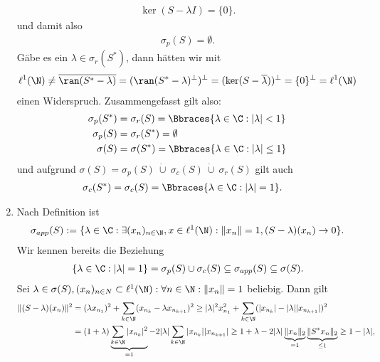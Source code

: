 \begin{solution}
\begin{enumerate}[label = (\alph*)]
  \begin{align*}
    \ker(S - \lambda I) = \{0\}.
  \end{align*}
  und damit also
  \begin{align*}
    \sigma_p(S) = \emptyset.
  \end{align*}
  Gäbe es ein $\lambda \in \sigma_r(S^*)$, dann hätten wir mit
  \begin{align*}
    \ell^1(\N) \neq \overline{\ran(S^* - \lambda)} = (\ran(S^* - \lambda)^{\bot})^{\bot} =
    (\ker(S - \overline{\lambda}))^{\bot} = \{0\}^{\bot} = \ell^1(\N)
  \end{align*}
  einen Widerspruch. Zusammengefasst gilt also:
  \begin{align*}
    \sigma_p(S^\ast) &= \sigma_r(S) = \Bbraces{\lambda \in \C: |\lambda| < 1} \\
    \sigma_p(S) &= \sigma_r(S^*) = \emptyset \\
    \sigma(S) &= \sigma(S^*) = \Bbraces{\lambda \in \C: |\lambda| \leq 1}
  \end{align*}
  und aufgrund $\sigma(S) = \sigma_p(S) ~\dot \cup~ \sigma_c(S) ~\dot \cup~ \sigma_r(S)$ gilt auch
  \begin{align*}
    \sigma_c(S^\ast) &= \sigma_c(S) = \Bbraces{\lambda \in \C: |\lambda| = 1}.
  \end{align*}
  \item Nach Definition ist
  \begin{align*}
    \sigma_{app}(S) := \{\lambda \in \C: \exists (x_n)_{n \in \N}, x \in \ell^1(\N): \|x_n\| = 1, (S - \lambda)(x_n) \to 0\}.
  \end{align*}
  Wir kennen bereits die Beziehung
  \begin{align*}
    \{\lambda \in \C: |\lambda| = 1 \} = \sigma_p(S) \cup \sigma_c(S) \subseteq \sigma_{app}(S) \subseteq \sigma(S).
  \end{align*}
  Sei $\lambda \in \sigma(S), (x_n)_{n \in N} \subset \ell^1(\N): \forall n \in \N: \|x_n\| = 1$ beliebig. Dann gilt
  \begin{align*}
    \|(S - \lambda)(x_n)\|^2 &=  (\lambda x_{n_1})^2 + \sum_{k \in \N}(x_{n_k}- \lambda x_{n_{k+1}})^2
    \geq |\lambda|^2x_{n_1}^2 + \sum_{k \in \N}(|x_{n_k}|- |\lambda| |x_{n_{k+1}}|)^2 \\
    &= (1 + \lambda)\underbrace{\sum_{k \in \N}|x_{n_k}|^2}_{= 1} - 2|\lambda|\sum_{k \in \N}|x_{n_k}| |x_{n_{k+1}}|
    \geq 1 + \lambda - 2|\lambda|\underbrace{\|x_n\|_2}_{=1}\underbrace{\|S^*x_n\|_2}_{\leq 1} \geq 1 - |\lambda|,
  \end{align*}

\end{enumerate}
\end{solution}
